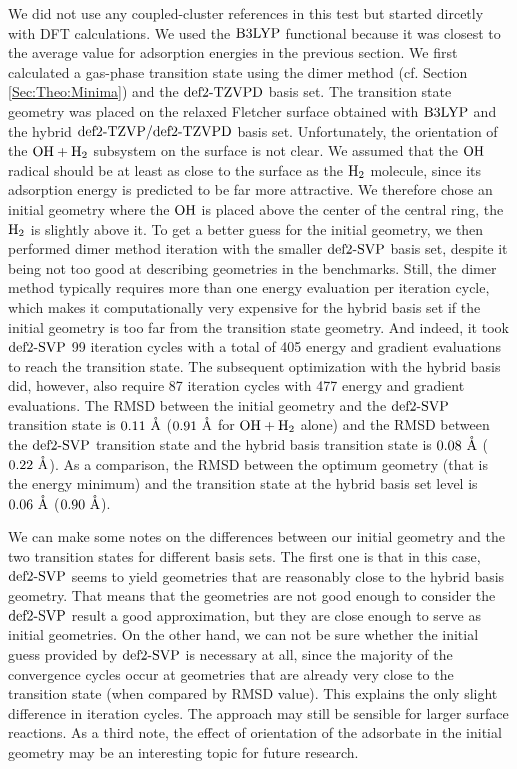 \documentclass[8.5pt,twoside,twocolumn]{article}
\renewcommand{\Ang}{\mathring{\te{A}}}
\theoremstyle{standard}
\begin{document}
We did not use any coupled-cluster references in this test but started
dircetly with DFT calculations. We used the $\text{B3LYP}$ functional because it was
closest to the average value for adsorption energies in the previous section.
We first calculated a gas-phase transition state using the dimer method (cf.
Section \ref{Sec:Theo:Minima}) and the $\text{def2-TZVPD}$ basis set. The transition
state geometry was placed on the relaxed Fletcher surface obtained with
$\text{B3LYP}$ and the hybrid $\text{def2-TZVP}/\text{def2-TZVPD}$ basis set. Unfortunately, the orientation
of the $\mbox{\ensuremath{\text O \text H+\text H_2}}$ subsystem on the surface is not clear. We assumed that the $\text O \text H$
radical should be at least as close to the surface as the $\text H_2$ molecule, since
its adsorption energy is predicted to be far more attractive. We therefore
chose an initial geometry where the $\text O \text H$ is placed above the center of the
central ring, the $\text H_2$ is slightly above it. To get a better guess for the
initial geometry, we then performed dimer method iteration with the smaller
$\text{def2-SVP}$ basis set, despite it being not too good at describing geometries in the
benchmarks. Still, the dimer method typically requires more than one energy
evaluation per iteration cycle, which makes it computationally very expensive
for the hybrid basis set if the initial geometry is too far from the transition
state geometry. And indeed, it took $\text{def2-SVP}$ 99 iteration cycles with a total of
405 energy and gradient evaluations to reach the transition state. The
subsequent optimization with the hybrid basis did, however, also require
87 iteration cycles with 477 energy and gradient evaluations. The RMSD between
the initial geometry and the $\text{def2-SVP}$ transition state is $0.11~\Ang$
($0.91~\Ang$ for $\mbox{\ensuremath{\text O \text H+\text H_2}}$ alone) and the RMSD between the $\text{def2-SVP}$
transition state and the hybrid basis transition state is $0.08~\Ang$
($0.22~\Ang$). As a comparison, the RMSD between the optimum geometry
(that is the energy minimum) and the transition state at the hybrid basis set
level is $0.06~\Ang$ ($0.90~\Ang$).

We can make some notes on the differences between our initial geometry and the
two transition states for different basis sets. The first one is that in this
case, $\text{def2-SVP}$ seems to yield geometries that are reasonably close to the hybrid
basis geometry. That means that the geometries are not good
enough to consider the $\text{def2-SVP}$ result a good approximation, but they are close
enough to serve as initial geometries. On the other hand, we can not be sure
whether the initial guess provided by $\text{def2-SVP}$ is necessary at all, since the
majority of the convergence cycles occur at geometries that are already very
close to the transition state (when compared by RMSD value). This explains the
only slight difference in iteration cycles. The approach may still be sensible
for larger surface reactions. As a third note, the effect of orientation of the
adsorbate in the initial geometry may be an interesting topic for future
research.
\end{document}
